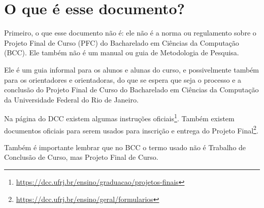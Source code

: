 \chapter{O que é esse documento?}

Primeiro, o que esse documento não é: ele não é a norma ou regulamento sobre o Projeto Final de Curso (PFC) do Bacharelado em Ciências da Computação (BCC). Ele também não é um manual ou guia de Metodologia de Pesquisa.

Ele é um guia informal para os alunos e alunas do curso, e possivelmente também para os orientadores e orientadoras, do que se espera que seja o processo e a conclusão do Projeto Final de Curso do Bacharelado em Ciências da Computação da Universidade Federal do Rio de Janeiro.

Na página do DCC existem algumas instruções oficiais\footnote{\url{https://dcc.ufrj.br/ensino/graduacao/projetos-finais}}. Também existem documentos oficiais para serem usados para inscrição e entrega do Projeto Final\footnote{\url{https://dcc.ufrj.br/ensino/geral/formularios}}.

Também é importante lembrar que no BCC o termo usado não é Trabalho de Conclusão de Curso, mas Projeto Final de Curso.

